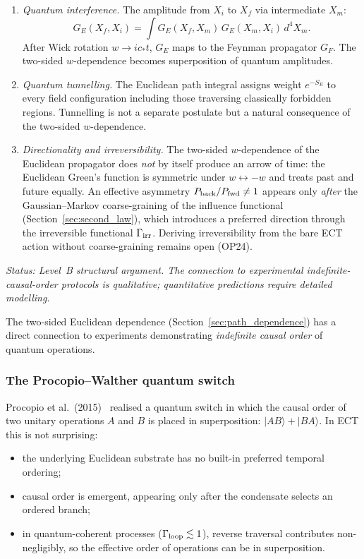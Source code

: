 \documentclass[11pt,a4paper]{article}
\numberwithin{equation}{section}
\begin{document}
\begin{enumerate}

\item \textit{Quantum interference.}
  The amplitude from $X_i$ to $X_f$ via intermediate $X_m$:
  \[
    G_E(X_f, X_i) = \int G_E(X_f, X_m)\, G_E(X_m, X_i)\, d^4X_m.
  \]
  After Wick rotation $w \to ic_*t$, $G_E$ maps to the Feynman
  propagator $G_F$.  The two-sided $w$-dependence becomes
  superposition of quantum amplitudes.

\item \textit{Quantum tunnelling.}
  The Euclidean path integral assigns weight $e^{-S_E}$ to every
  field configuration including those traversing classically
  forbidden regions.  Tunnelling is not a separate postulate but
  a natural consequence of the two-sided $w$-dependence.

\item \textit{Directionality and irreversibility.}
  The two-sided $w$-dependence of the Euclidean propagator does
  \emph{not} by itself produce an arrow of time: the Euclidean
  Green's function is symmetric under $w\leftrightarrow -w$ and
  treats past and future equally.  An effective asymmetry
  $P_{\rm back}/P_{\rm fwd} \neq 1$ appears only \emph{after}
  the Gaussian--Markov coarse-graining of the influence functional
  (Section~\ref{sec:second_law}), which introduces a preferred
  direction through the irreversible functional $\Gamma_{\rm irr}$.
  Deriving irreversibility from the bare ECT action without
  coarse-graining remains open (OP24).

\end{enumerate}

\label{sec:indefinite_causal_order}

\textit{Status: Level~B structural argument. The connection
to experimental indefinite-causal-order protocols is qualitative;
quantitative predictions require detailed modelling.}

\medskip
The two-sided Euclidean dependence (Section~\ref{sec:path_dependence})
has a direct connection to experiments demonstrating
\emph{indefinite causal order} of quantum operations.

\subsubsection*{The Procopio--Walther quantum switch}

Procopio et al.\ (2015)~\cite{Procopio2015} realised a quantum switch
in which the causal order of two unitary operations $A$ and $B$
is placed in superposition: $|AB\rangle + |BA\rangle$.
In ECT this is not surprising:
\begin{itemize}
  \item the underlying Euclidean substrate has no built-in preferred
  temporal ordering;
  \item causal order is emergent, appearing only after the condensate
  selects an ordered branch;
  \item in quantum-coherent processes ($\Gamma_{\rm loop}\lesssim1$),
  reverse traversal contributes non-negligibly, so the effective
  order of operations can be in superposition.
\end{itemize}
\end{document}
